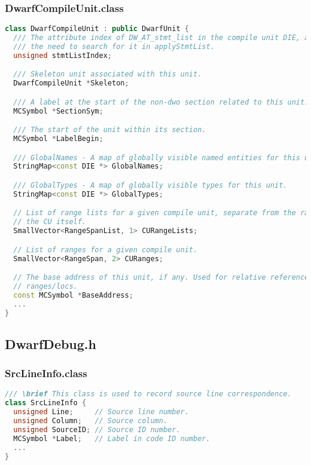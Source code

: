 \documentclass{ctexart}
\begin{document}
\subsubsection{DwarfCompileUnit.class}
\begin{lstlisting}[language=C++]
class DwarfCompileUnit : public DwarfUnit {
  /// The attribute index of DW_AT_stmt_list in the compile unit DIE, avoiding
  /// the need to search for it in applyStmtList.
  unsigned stmtListIndex;

  /// Skeleton unit associated with this unit.
  DwarfCompileUnit *Skeleton;

  /// A label at the start of the non-dwo section related to this unit.
  MCSymbol *SectionSym;

  /// The start of the unit within its section.
  MCSymbol *LabelBegin;

  /// GlobalNames - A map of globally visible named entities for this unit.
  StringMap<const DIE *> GlobalNames;

  /// GlobalTypes - A map of globally visible types for this unit.
  StringMap<const DIE *> GlobalTypes;

  // List of range lists for a given compile unit, separate from the ranges for
  // the CU itself.
  SmallVector<RangeSpanList, 1> CURangeLists;

  // List of ranges for a given compile unit.
  SmallVector<RangeSpan, 2> CURanges;

  // The base address of this unit, if any. Used for relative references in
  // ranges/locs.
  const MCSymbol *BaseAddress;
  ...
}
\end{lstlisting}

\subsection{DwarfDebug.h}



\subsubsection{SrcLineInfo.class}
\begin{lstlisting}[language=C++]
/// \brief This class is used to record source line correspondence.
class SrcLineInfo {
  unsigned Line;     // Source line number.
  unsigned Column;   // Source column.
  unsigned SourceID; // Source ID number.
  MCSymbol *Label;   // Label in code ID number.
  ...
}
\end{lstlisting}
\end{document}
